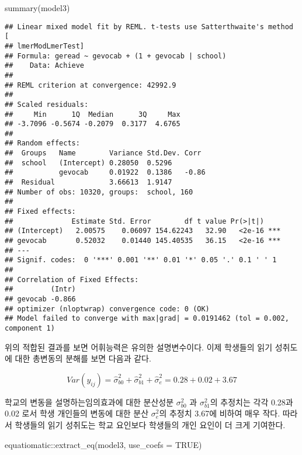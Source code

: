 \documentclass[
]{book}
\newenvironment{Shaded}{\begin{snugshade}}{\end{snugshade}}
\newcommand{\AttributeTok}[1]{\textcolor[rgb]{0.77,0.63,0.00}{#1}}
\newcommand{\ConstantTok}[1]{\textcolor[rgb]{0.00,0.00,0.00}{#1}}
\newcommand{\FunctionTok}[1]{\textcolor[rgb]{0.00,0.00,0.00}{#1}}
\newcommand{\NormalTok}[1]{#1}
\newcommand{\SpecialCharTok}[1]{\textcolor[rgb]{0.00,0.00,0.00}{#1}}
\begin{document}
\begin{Shaded}
\begin{Highlighting}[]
\FunctionTok{summary}\NormalTok{(model3)}
\end{Highlighting}
\end{Shaded}

\begin{verbatim}
## Linear mixed model fit by REML. t-tests use Satterthwaite's method [
## lmerModLmerTest]
## Formula: geread ~ gevocab + (1 + gevocab | school)
##    Data: Achieve
## 
## REML criterion at convergence: 42992.9
## 
## Scaled residuals: 
##     Min      1Q  Median      3Q     Max 
## -3.7096 -0.5674 -0.2079  0.3177  4.6765 
## 
## Random effects:
##  Groups   Name        Variance Std.Dev. Corr 
##  school   (Intercept) 0.28050  0.5296        
##           gevocab     0.01922  0.1386   -0.86
##  Residual             3.66613  1.9147        
## Number of obs: 10320, groups:  school, 160
## 
## Fixed effects:
##              Estimate Std. Error        df t value Pr(>|t|)    
## (Intercept)   2.00575    0.06097 154.62243   32.90   <2e-16 ***
## gevocab       0.52032    0.01440 145.40535   36.15   <2e-16 ***
## ---
## Signif. codes:  0 '***' 0.001 '**' 0.01 '*' 0.05 '.' 0.1 ' ' 1
## 
## Correlation of Fixed Effects:
##         (Intr)
## gevocab -0.866
## optimizer (nloptwrap) convergence code: 0 (OK)
## Model failed to converge with max|grad| = 0.0191462 (tol = 0.002, component 1)
\end{verbatim}

위의 적합된 결과를 보면 어휘능력은 유의한 설명변수이다. 이제 학생들의 읽기 성취도에 대한 총변동의 분해를 보면 다음과 같다.

\[ Var(y_{ij}) = \hat{\sigma}_{b0}^2 + \hat{\sigma}_{b1}^2 + \hat{\sigma}_e^2 = 0.28 + 0.02 + 3.67 \]

학교의 변동을 설명하는임의효과에 대한 분산성분 \(\sigma_{b0}^2\) 과 \(\sigma_{b1}^2\)의 추정치는 각각 0.28과 0.02 로서 학생 개인들의 변동에 대한 분산 \(\sigma_e^2\)의 추정치 3.67에 비하여 매우 작다.
따라서 학생들의 읽기 성취도는 학교 요인보다 학생들의 개인 요인이 더 크게 기여한다.

\begin{Shaded}
\begin{Highlighting}[]
\NormalTok{equatiomatic}\SpecialCharTok{::}\FunctionTok{extract\_eq}\NormalTok{(model3, }\AttributeTok{use\_coefs =} \ConstantTok{TRUE}\NormalTok{)}
\end{Highlighting}
\end{Shaded}
\end{document}
